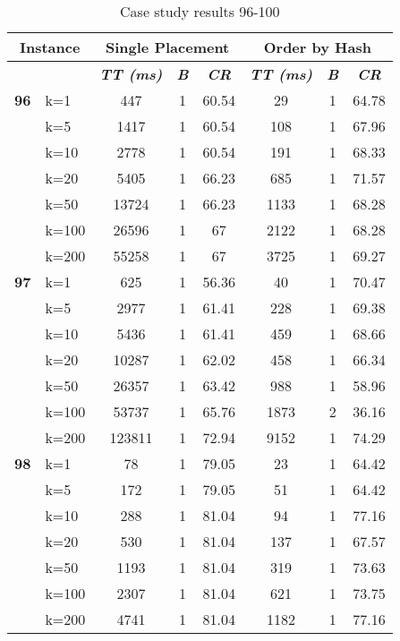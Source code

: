    \begin{table}[htbp]
    \caption{Case study results 96-100}
    \centering
    \begin{tabular}{|l|l|c|c|c|c|c|c|}
    \hline
    \multicolumn{ 2}{|c|}{\textbf{Instance}} & \multicolumn{ 3}{c|}{\textbf{Single Placement}} & \multicolumn{ 3}{c|}{\textbf{Order by Hash}} \\ \hline
    \multicolumn{ 2}{|l|}{} & \textbf{\textit{TT (ms)}} & \textbf{\textit{B}} & \textbf{\textit{CR}} & \textbf{\textit{TT (ms)}} & \textbf{\textit{B}} & \textbf{\textit{CR}} \\ \hline
    \multicolumn{1}{|r|}{\textbf{96}} & k=1 & 447 & 1 & 60.54 & 29 & 1 & 64.78 \\ 
     & k=5 & 1417 & 1 & 60.54 & 108 & 1 & 67.96 \\ 
     & k=10 & 2778 & 1 & 60.54 & 191 & 1 & 68.33 \\ 
     & k=20 & 5405 & 1 & 66.23 & 685 & 1 & 71.57 \\ 
     & k=50 & 13724 & 1 & 66.23 & 1133 & 1 & 68.28 \\ 
     & k=100 & 26596 & 1 & 67 & 2122 & 1 & 68.28 \\ 
     & k=200 & 55258 & 1 & 67 & 3725 & 1 & 69.27 \\ \hline
    \multicolumn{1}{|r|}{\textbf{97}} & k=1 & 625 & 1 & 56.36 & 40 & 1 & 70.47 \\ 
     & k=5 & 2977 & 1 & 61.41 & 228 & 1 & 69.38 \\ 
     & k=10 & 5436 & 1 & 61.41 & 459 & 1 & 68.66 \\ 
     & k=20 & 10287 & 1 & 62.02 & 458 & 1 & 66.34 \\ 
     & k=50 & 26357 & 1 & 63.42 & 988 & 1 & 58.96 \\ 
     & k=100 & 53737 & 1 & 65.76 & 1873 & 2 & 36.16 \\ 
     & k=200 & 123811 & 1 & 72.94 & 9152 & 1 & 74.29 \\ \hline
    \multicolumn{1}{|r|}{\textbf{98}} & k=1 & 78 & 1 & 79.05 & 23 & 1 & 64.42 \\ 
     & k=5 & 172 & 1 & 79.05 & 51 & 1 & 64.42 \\ 
     & k=10 & 288 & 1 & 81.04 & 94 & 1 & 77.16 \\ 
     & k=20 & 530 & 1 & 81.04 & 137 & 1 & 67.57 \\ 
     & k=50 & 1193 & 1 & 81.04 & 319 & 1 & 73.63 \\ 
     & k=100 & 2307 & 1 & 81.04 & 621 & 1 & 73.75 \\ 
     & k=200 & 4741 & 1 & 81.04 & 1182 & 1 & 77.16 \\ \hline

\end{tabular}
\end{table}
